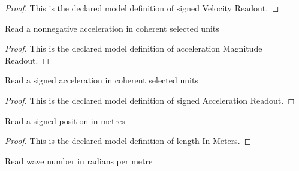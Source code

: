 \begin{proof}
  This is the declared model definition of signed Velocity Readout.
\end{proof}
\begin{definition}
  \label{def:physics:phyx-mini-0302:phyxminiproblems-problemphyxmini0302-accelerationmagnitudereadout}
  Read a nonnegative acceleration in coherent selected units
\end{definition}
\begin{proof}
  This is the declared model definition of acceleration Magnitude Readout.
\end{proof}
\begin{definition}
  \label{def:physics:phyx-mini-0302:phyxminiproblems-problemphyxmini0302-signedaccelerationreadout}
  Read a signed acceleration in coherent selected units
\end{definition}
\begin{proof}
  This is the declared model definition of signed Acceleration Readout.
\end{proof}
\begin{definition}
  \label{def:physics:phyx-mini-0302:phyxminiproblems-problemphyxmini0302-lengthinmeters}
  Read a signed position in metres
\end{definition}
\begin{proof}
  This is the declared model definition of length In Meters.
\end{proof}
\begin{definition}
  \label{def:physics:phyx-mini-0302:phyxminiproblems-problemphyxmini0302-wavenumberinradianspermeter}
  Read wave number in radians per metre
\end{definition}
